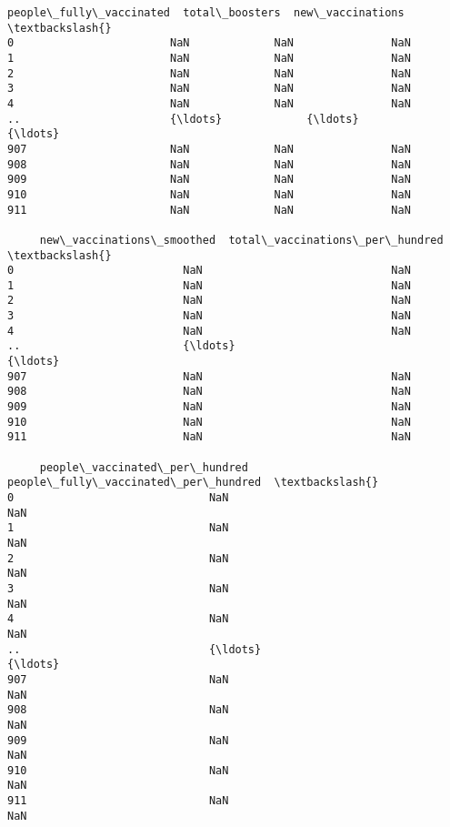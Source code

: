 \documentclass[11pt]{article}
\begin{document}
\begin{tcolorbox}[breakable, size=fbox, boxrule=.5pt, pad at break*=1mm, opacityfill=0]
\begin{Verbatim}[commandchars=\\\{\}]
     people\_fully\_vaccinated  total\_boosters  new\_vaccinations  \textbackslash{}
0                        NaN             NaN               NaN
1                        NaN             NaN               NaN
2                        NaN             NaN               NaN
3                        NaN             NaN               NaN
4                        NaN             NaN               NaN
..                       {\ldots}             {\ldots}               {\ldots}
907                      NaN             NaN               NaN
908                      NaN             NaN               NaN
909                      NaN             NaN               NaN
910                      NaN             NaN               NaN
911                      NaN             NaN               NaN

     new\_vaccinations\_smoothed  total\_vaccinations\_per\_hundred  \textbackslash{}
0                          NaN                             NaN
1                          NaN                             NaN
2                          NaN                             NaN
3                          NaN                             NaN
4                          NaN                             NaN
..                         {\ldots}                             {\ldots}
907                        NaN                             NaN
908                        NaN                             NaN
909                        NaN                             NaN
910                        NaN                             NaN
911                        NaN                             NaN

     people\_vaccinated\_per\_hundred  people\_fully\_vaccinated\_per\_hundred  \textbackslash{}
0                              NaN                                  NaN
1                              NaN                                  NaN
2                              NaN                                  NaN
3                              NaN                                  NaN
4                              NaN                                  NaN
..                             {\ldots}                                  {\ldots}
907                            NaN                                  NaN
908                            NaN                                  NaN
909                            NaN                                  NaN
910                            NaN                                  NaN
911                            NaN                                  NaN


\end{Verbatim}
\end{tcolorbox}
\end{document}
